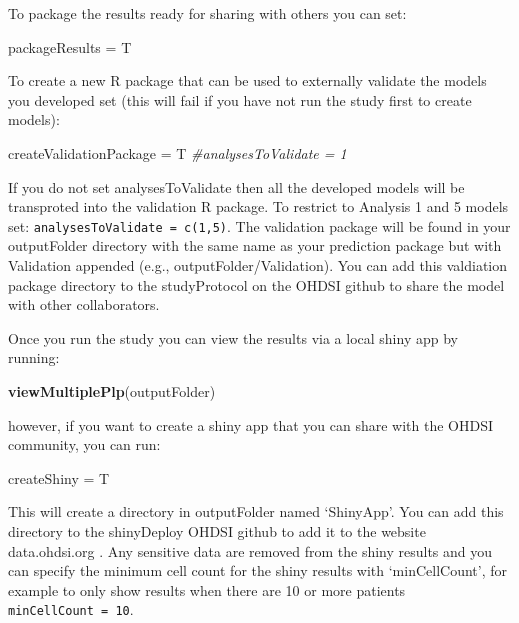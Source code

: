 \documentclass[
]{article}
\newenvironment{Shaded}{\begin{snugshade}}{\end{snugshade}}
\newcommand{\CommentTok}[1]{\textcolor[rgb]{0.56,0.35,0.01}{\textit{#1}}}
\newcommand{\KeywordTok}[1]{\textcolor[rgb]{0.13,0.29,0.53}{\textbf{#1}}}
\newcommand{\NormalTok}[1]{#1}
\newcommand{\StringTok}[1]{\textcolor[rgb]{0.31,0.60,0.02}{#1}}
\begin{document}
To package the results ready for sharing with others you can set:

\begin{Shaded}
\begin{Highlighting}[]
\NormalTok{    packageResults =}\StringTok{ }\NormalTok{T}
\end{Highlighting}
\end{Shaded}

To create a new R package that can be used to externally validate the
models you developed set (this will fail if you have not run the study
first to create models):

\begin{Shaded}
\begin{Highlighting}[]
\NormalTok{    createValidationPackage =}\StringTok{ }\NormalTok{T  }
    \CommentTok{#analysesToValidate = 1}
\end{Highlighting}
\end{Shaded}

If you do not set analysesToValidate then all the developed models will
be transproted into the validation R package. To restrict to Analysis 1
and 5 models set: \texttt{analysesToValidate\ =\ c(1,5)}. The validation
package will be found in your outputFolder directory with the same name
as your prediction package but with Validation appended (e.g.,
outputFolder/Validation). You can add this valdiation package directory
to the studyProtocol on the OHDSI github to share the model with other
collaborators.

Once you run the study you can view the results via a local shiny app by
running:

\begin{Shaded}
\begin{Highlighting}[]
    \KeywordTok{viewMultiplePlp}\NormalTok{(outputFolder) }
\end{Highlighting}
\end{Shaded}

however, if you want to create a shiny app that you can share with the
OHDSI community, you can run:

\begin{Shaded}
\begin{Highlighting}[]
\NormalTok{    createShiny =}\StringTok{ }\NormalTok{T  }
\end{Highlighting}
\end{Shaded}

This will create a directory in outputFolder named `ShinyApp'. You can
add this directory to the shinyDeploy OHDSI github to add it to the
website data.ohdsi.org . Any sensitive data are removed from the shiny
results and you can specify the minimum cell count for the shiny results
with `minCellCount', for example to only show results when there are 10
or more patients \texttt{minCellCount\ =\ 10}.
\end{document}
